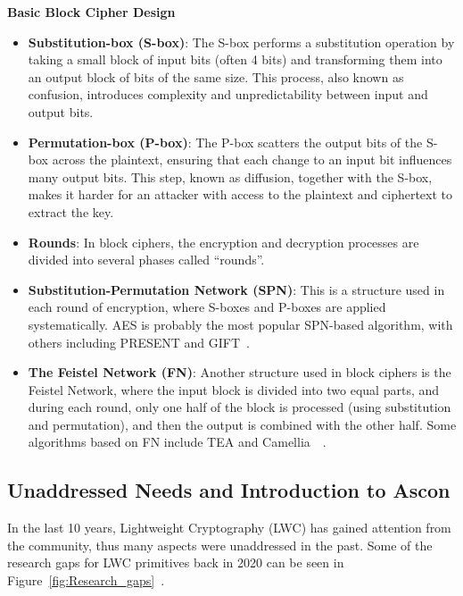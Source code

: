 \textbf{Basic Block Cipher Design}
\begin{itemize}
    \item \textbf{Substitution-box (S-box)}: The S-box performs a substitution operation by taking a small block of input bits (often 4 bits) and transforming them into an output block of bits of the same size. This process, also known as confusion, introduces complexity and unpredictability between input and output bits.
    \item \textbf{Permutation-box (P-box)}: The P-box scatters the output bits of the S-box across the plaintext, ensuring that each change to an input bit influences many output bits. This step, known as diffusion, together with the S-box, makes it harder for an attacker with access to the plaintext and ciphertext to extract the key.
    \item \textbf{Rounds}: In block ciphers, the encryption and decryption processes are divided into several phases called ``rounds''.
    \item \textbf{Substitution-Permutation Network (SPN)}: This is a structure used in each round of encryption, where S-boxes and P-boxes are applied systematically. AES is probably the most popular SPN-based algorithm, with others including PRESENT and GIFT~.
    \item \textbf{The Feistel Network (FN)}: Another structure used in block ciphers is the Feistel Network, where the input block is divided into two equal parts, and during each round, only one half of the block is processed (using substitution and permutation), and then the output is combined with the other half. Some algorithms based on FN include TEA and Camellia~\cite{ekwueme2024lightweight}~\cite{chauhan2022analysis}.
\end{itemize}



\subsection{Unaddressed Needs and Introduction to Ascon}

In the last 10 years, Lightweight Cryptography (LWC) has gained attention from the community, thus many aspects were unaddressed in the past. Some of the research gaps for LWC primitives back in 2020 can be seen in Figure~\ref{fig:Research_gaps}~\cite{dhanda2020lightweight}.

